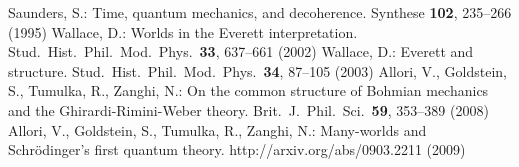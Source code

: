 \documentclass[12pt]{article}
\begin{document}
\begin{thebibliography}{99}
%
 Saunders, S.:
Time, quantum mechanics, and decoherence.
Synthese \textbf{102}, 235--266 (1995)
%
 Wallace, D.:
Worlds in the Everett interpretation.
Stud.\ Hist.\ Phil.\ Mod.\ Phys.\ \textbf{33}, 637--661 (2002)
%
 Wallace, D.:
Everett and structure.
Stud.\ Hist.\ Phil.\ Mod.\ Phys.\ \textbf{34}, 87--105 (2003)
%
 Allori, V., Goldstein, S.,
Tumulka, R., Zanghi, N.:
On the common structure of Bohmian mechanics and the
Ghirardi-Rimini-Weber theory.
Brit.\ J.\ Phil.\ Sci.\ \textbf{59}, 353--389 (2008)
%
 Allori, V., Goldstein, S.,
Tumulka, R., Zanghi, N.:
Many-worlds and Schr\"{o}dinger's first quantum theory.
http://arxiv.org/abs/0903.2211 (2009)
%
%
%
\begin{comment}
\bibitem{aharonov} Y.~Aharonov and D.~Z.~Albert,
``Can we make sense out of the measurement process
in relativistic quantum mechanics?''
\textit{Phys.\ Rev.\ D}
\textbf{24}, 359--70 (1981).
%
\end{comment}
\end{thebibliography}
%
\end{document}
